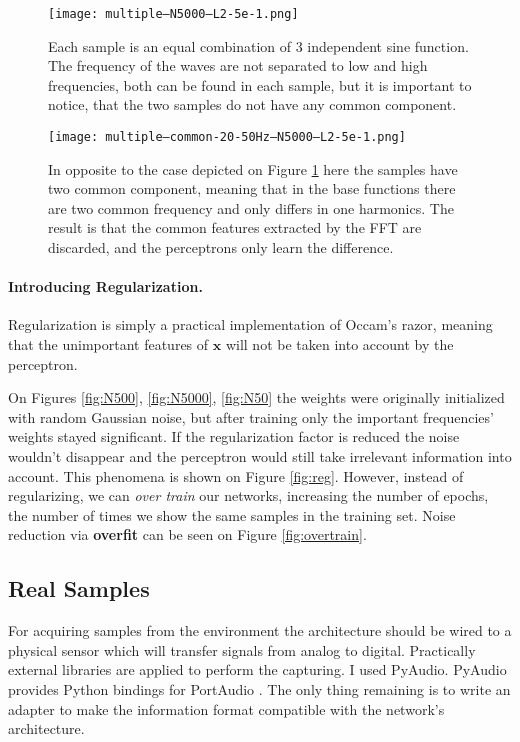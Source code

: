 \begin{figure}
	\centering
	\texttt{[image: multiple---N5000---L2-5e-1.png]}
	\caption{Each sample is an equal combination of 3 independent sine function. The frequency of the waves are not separated to low and high frequencies, both can be found in each sample, but it is important to notice, that the two samples do not have any common component.}
	
	\label{fig:multi}
\end{figure}


\begin{figure}
	\centering
	\texttt{[image: multiple--common-20-50Hz--N5000---L2-5e-1.png]}
	\caption{In opposite to the case depicted on Figure \ref{fig:multi} here the samples have two common component, meaning that in the base functions there are two common frequency and only differs in one harmonics. The result is that the common features extracted by the FFT are discarded, and the perceptrons only learn the difference.}
	
	\label{fig:multi-common}
\end{figure}

\paragraph{Introducing Regularization.}
Regularization is simply a practical implementation of Occam's razor, meaning that the unimportant features of $\mathbf{x}$ will not be taken into account by the perceptron. 

On Figures \ref{fig:N500}, \ref{fig:N5000}, \ref{fig:N50} the weights were originally initialized with random Gaussian noise, but after training only the important frequencies' weights stayed significant. 
If the regularization factor is reduced the noise wouldn't disappear and the perceptron would still take irrelevant information into account. 
This phenomena is shown on Figure \ref{fig:reg}. 
However, instead of regularizing, we can \emph{over train} our networks, increasing the number of epochs, the number of times we show the same samples in the training set. 
Noise reduction via \textbf{overfit} can be seen on Figure \ref{fig:overtrain}. 

\subsection{Real Samples}
For acquiring samples from the environment the architecture should be wired to a physical sensor which will transfer signals from analog to digital. 
Practically external libraries are applied to perform the capturing. I used PyAudio. PyAudio provides Python bindings for PortAudio \cite{pham2006pyaudio}. 
The only thing remaining is to write an adapter to make the information format compatible with the network's architecture.

